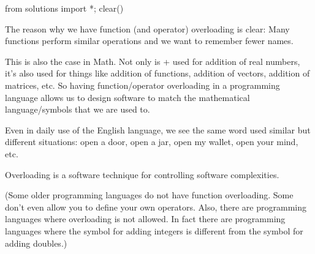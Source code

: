 \begin{python0}
from solutions import *; clear()
\end{python0}

The reason why we have function (and operator) overloading is clear: Many functions perform similar operations and we want to remember fewer names.

This is also the case in Math. Not only is + used for addition of real numbers, it's also used for things like addition of functions, addition of vectors, addition of matrices, etc. So having function/operator overloading in a programming language allows us to design software to match the mathematical language/symbols that we are used to.

Even in daily use of the English language, we see the same word used similar but different situations: open a door, open a jar, open my wallet, open your mind, etc.

Overloading is a software technique for controlling software complexities.

(Some older programming languages do not have function overloading. Some don't even allow you to define your own operators. Also, there are programming languages where overloading is not allowed. In fact there are programming languages where the symbol for adding integers is different from the symbol for adding doubles.)


